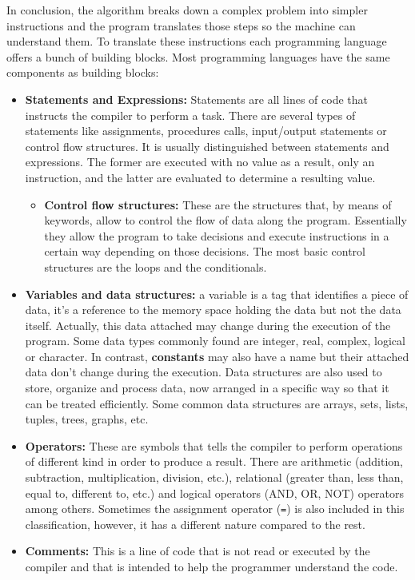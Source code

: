 In conclusion, the algorithm breaks down a complex problem into simpler instructions 
and the program translates those steps so the machine can understand them. 
To translate these instructions each programming language offers a bunch of building blocks.
Most programming languages have the same components as building blocks:
\begin{itemize}[noitemsep]
    \item \textbf{Statements and Expressions:} Statements are all lines of code that instructs the compiler to perform a task.
    There are several types of statements like assignments, procedures calls, input/output statements or control flow structures. 
    It is usually distinguished between statements and expressions. 
    The former are executed with no value as a result, only an instruction, 
    and the latter are evaluated to determine a resulting value.
    \begin{itemize}
        \item \textbf{Control flow structures:} These are the structures that, by means of keywords, allow to control the flow of data along the program. 
        Essentially they allow the program to take decisions and execute instructions in a certain way depending on those decisions. 
        The most basic control structures are the loops and the conditionals.  
    \end{itemize}
    
    \item \textbf{Variables and data structures:} a variable is a tag that identifies a piece of data, 
    it's a reference to the memory space holding the data but not the data itself. 
    Actually, this data attached may change during the execution of the program. 
    Some data types commonly found are integer, real, complex, logical or character.
    In contrast, \textbf{constants} may also have a name but their attached data don't change during the execution.
    Data structures are also used to store, organize and process data, 
    now arranged in a specific way so that it can be treated efficiently. 
    Some common data structures are arrays, sets, lists, tuples, trees, graphs, etc.
    
    \item \textbf{Operators:} These are symbols that tells the compiler to perform operations of different kind in order to produce a result.
    There are arithmetic (addition, subtraction, multiplication, division, etc.), 
    relational (greater than, less than, equal to, different to, etc.) and 
    logical operators (AND, OR, NOT) operators among others. 
    Sometimes the assignment operator (\texttt{=}) is also included in this classification, 
    however, it has a different nature compared to the rest. 
    
    \item \textbf{Comments:} This is a line of code that is not read or executed by the compiler and 
    that is intended to help the programmer understand the code.
    
\end{itemize}

